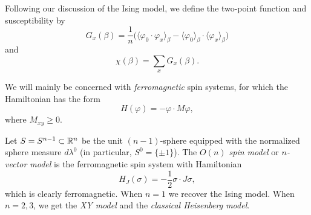 Following our discussion of the Ising model, we define the two-point function
and susceptibility by
\begin{equation}
G_x(\beta)
  =
\frac{1}{n}
\big(\langle \varphi_0 \cdot \varphi_x \rangle_\beta
  -
\langle \varphi_0 \rangle_\beta \cdot \langle \varphi_x \rangle_\beta\big)
\end{equation}
and
\begin{equation}
\chi(\beta) = \sum_x G_x(\beta).
\end{equation}

We will mainly be concerned with \emph{ferromagnetic} spin systems, for which the
Hamiltonian has the form
\begin{equation}
H(\varphi) = -\varphi \cdot M\varphi,
\end{equation}
where $M_{xy} \ge 0$.



\begin{example}
Let $S = S^{n-1} \subset {\mathbb R}^n$ be the unit $(n-1)$-sphere equipped with the normalized sphere measure
$d\lambda^0$ (in particular, $S^0 = \{ \pm 1 \}$).
The \emph{$O(n)$ spin model} or \emph{$n$-vector model} is the
ferromagnetic spin system with Hamiltonian
\begin{equation}
H_J(\sigma) = -\frac{1}{2} \sigma \cdot J \sigma,
\end{equation}
which is clearly ferromagnetic.
When $n = 1$ we recover the Ising model. When $n = 2, 3$, we get the \emph{XY model} and the \emph{classical Heisenberg model}.
\end{example}



